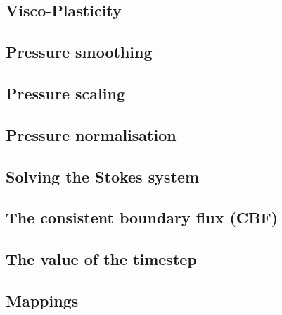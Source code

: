 \documentclass[a4paper]{article}
\begin{document}
\subsection{Visco-Plasticity}  %
\newpage %
\subsection{Pressure smoothing \label{psmoothing}}  %
\newpage %
\subsection{Pressure scaling}  %
\newpage %
\subsection{Pressure normalisation\label{ss_pnorm}}  %
\newpage %
\subsection{Solving the Stokes system \label{sec:solvers}}  %
\newpage %
\subsection{The consistent boundary flux (CBF)}  %
\newpage %
\subsection{The value of the timestep}  %
\newpage %
\subsection{Mappings}  %
\newpage %
\end{document}
